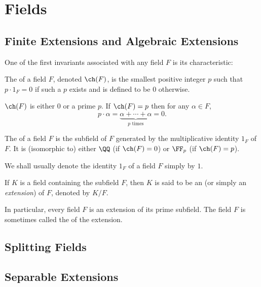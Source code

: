 \chapter{Fields}\label{chap:fields}
\section{Finite Extensions and Algebraic Extensions}
One of the first invariants associated with any field $F$ is its characteristic:

\begin{definition}[Characteristic]
The  of a field $F$, denoted $\ch(F)$, is the smallest positive integer $p$ such that $p\cdot 1_F=0$ if such a $p$ exists and is defined to be $0$ otherwise.
\end{definition}

\begin{proposition}
$\ch(F)$ is either $0$ or a prime $p$. If $\ch(F)=p$ then for any $\alpha\in F$,
\[p\cdot\alpha=\underbrace{\alpha+\cdots+\alpha}_\text{$p$ times}=0.\]
\end{proposition}

\begin{definition}
The  of a field $F$ is the subfield of $F$ generated by the multiplicative identity $1_F$ of $F$. It is (isomorphic to) either $\QQ$ (if $\ch(F)=0$) or $\FF_p$ (if $\ch(F)=p$).
\end{definition}

\begin{notation}
We shall usually denote the identity $1_F$ of a field $F$ simply by $1$.
\end{notation}

\begin{definition}
If $K$ is a field containing the subfield $F$, then $K$ is said to be an  (or simply an \emph{extension}) of $F$, denoted by $K/F$.
\end{definition}

In particular, every field $F$ is an extension of its prime subfield. The field $F$ is sometimes called the  of the extension.

\section{Splitting Fields}
\section{Separable Extensions}

